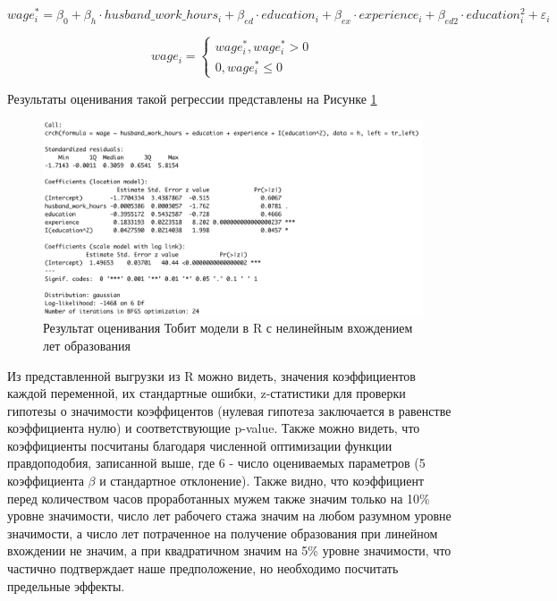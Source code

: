 \documentclass[a4paper,12pt]{article}
\begin{document}
\begin{equation*}
	wage_i^* =  \beta_0 + \beta_h \cdot husband\_work\_hours_i +\beta_{ed} \cdot education_i + \beta_{ex} \cdot experience_i + \beta_{ed2} \cdot education_i^2 +  \varepsilon_i
\end{equation*}

\begin{equation*}
	wage_i = 
	\begin{cases}
		wage_i^*, wage_i^*  >  0 \\
		0, wage_i^*  \leq 0
	\end{cases}
\end{equation*}

Результаты оценивания такой регрессии представлены на Рисунке \ref{tobit2}


\begin{figure}[!h] \centering
	\caption{Результат оценивания Тобит модели в R с нелинейным вхождением лет образования }
	\label{tobit2}
	\includegraphics[scale=0.67]{tobit2.png}
\end{figure}

Из представленной выгрузки из R можно видеть, значения коэффициентов каждой переменной, их стандартные ошибки, z-статистики для проверки гипотезы о значимости коэффицентов (нулевая гипотеза заключается в равенстве коэффициента нулю) и соответствующие p-value. Также можно видеть, что коэффициенты посчитаны благодаря численной оптимизации функции правдоподобия, записанной выше, где 6 - число оцениваемых параметров (5 коэффициента $\beta$ и стандартное отклонение). Также видно, что коэффициент перед количеством часов проработанных мужем также значим только на 10\% уровне значимости, число лет рабочего стажа значим на любом разумном уровне значимости, а число лет потраченное на получение образования при линейном вхождении не значим, а при квадратичном значим на 5\% уровне значимости, что частично подтверждает наше предположение, но необходимо посчитать предельные эффекты.
\end{document}
